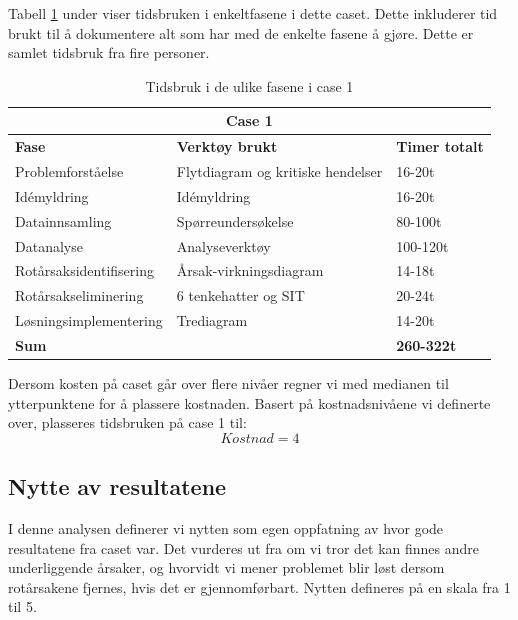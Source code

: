 Tabell \ref{tab:tidsbruk_case1} under viser tidsbruken i enkeltfasene i dette caset. Dette inkluderer tid brukt til å dokumentere alt som har med de enkelte fasene å gjøre. Dette er samlet tidsbruk fra fire personer. 

\begin{table}[H]
  \centering
  \caption{Tidsbruk i de ulike fasene i case 1}
    \begin{tabular}{|lr|l|}
    \hline
    \multicolumn{3}{|c|}{\cellcolor{yellow}\textbf{Case 1}} \\ 
    \hline
    \multicolumn{1}{|l|}{\cellcolor{apricot}\textbf{Fase}} & \multicolumn{1}{l|}{\cellcolor{apricot}\textbf{Verktøy brukt}} & \cellcolor{apricot}\textbf{Timer totalt} \\
    \hline
    \multicolumn{1}{|l|}{Problemforståelse} & \multicolumn{1}{l|}{Flytdiagram og kritiske hendelser} & 16-20t \\
    \hline
    \multicolumn{1}{|l|}{Idémyldring} & \multicolumn{1}{l|}{Idémyldring} & 16-20t \\
    \hline
    \multicolumn{1}{|l|}{Datainnsamling} & \multicolumn{1}{l|}{Spørreundersøkelse} & 80-100t \\
    \hline
    \multicolumn{1}{|l|}{Datanalyse} & \multicolumn{1}{l|}{Analyseverktøy} & 100-120t \\
    \hline
    \multicolumn{1}{|l|}{Rotårsaksidentifisering} & \multicolumn{1}{l|}{Årsak-virkningsdiagram} & 14-18t \\
    \hline
    \multicolumn{1}{|l|}{Rotårsakseliminering} & \multicolumn{1}{l|}{6 tenkehatter og SIT} & 20-24t \\
    \hline
    \multicolumn{1}{|l|}{Løsningsimplementering} & \multicolumn{1}{l|}{Trediagram} & 14-20t \\
    \hline
    \multicolumn{2}{|l|}{\textbf{Sum}} & \textbf{260-322t} \\
    \hline
    \end{tabular}%
  \label{tab:tidsbruk_case1}%
\end{table}%

Dersom kosten på caset går over flere nivåer regner vi med medianen til ytterpunktene for å plassere kostnaden. Basert på kostnadsnivåene vi definerte over, plasseres tidsbruken på case 1 til:
\[Kostnad = 4\]

\subsection{Nytte av resultatene}
I denne analysen definerer vi nytten som egen oppfatning av hvor gode resultatene fra caset var. Det vurderes ut fra om vi tror det kan finnes andre underliggende årsaker, og hvorvidt vi mener problemet blir løst dersom rotårsakene fjernes, hvis det er gjennomførbart. Nytten defineres på en skala fra 1 til 5. 

